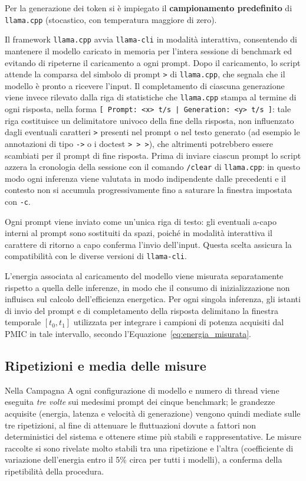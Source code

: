 Per la generazione dei token si è impiegato il \textbf{campionamento predefinito} di
\texttt{llama.cpp} (stocastico, con temperatura maggiore di zero).

Il framework \texttt{llama.cpp} avvia \texttt{llama-cli} in modalità interattiva,
consentendo di mantenere il modello caricato in memoria per l'intera sessione di
benchmark ed evitando di ripeterne il caricamento a ogni prompt. Dopo il caricamento, lo script
attende la comparsa del simbolo di prompt \texttt{>} di \texttt{llama.cpp}, che
segnala che il modello è pronto a ricevere l'input. Il completamento di ciascuna
generazione viene invece rilevato dalla riga di statistiche che \texttt{llama.cpp}
stampa al termine di ogni risposta, nella forma
\texttt{[ Prompt: <x> t/s | Generation: <y> t/s ]}: tale riga costituisce un
delimitatore univoco della fine della risposta, non influenzato dagli eventuali
caratteri \texttt{>} presenti nel prompt o nel testo generato (ad esempio le
annotazioni di tipo \texttt{->} o i doctest \texttt{> > >}), che altrimenti
potrebbero essere scambiati per il prompt di fine risposta. Prima di inviare
ciascun prompt lo script azzera la cronologia della
sessione con il comando \texttt{/clear} di \texttt{llama.cpp}: in questo modo ogni
inferenza viene valutata in modo indipendente dalle precedenti e il contesto non si
accumula progressivamente fino a saturare la finestra impostata con \texttt{-c}.

Ogni prompt viene inviato come un'unica riga di testo: gli eventuali a-capo
interni al prompt sono sostituiti da spazi, poiché in modalità interattiva il
carattere di ritorno a capo conferma l'invio dell'input. Questa scelta assicura la
compatibilità con le diverse versioni di \texttt{llama-cli}.

L'energia associata al caricamento del modello viene misurata separatamente
rispetto a quella delle inferenze, in modo che il consumo di inizializzazione non
influisca sul calcolo dell'efficienza energetica. Per ogni singola
inferenza, gli istanti di invio del prompt e di completamento della risposta
delimitano la finestra temporale $[t_0, t_1]$ utilizzata per integrare i campioni
di potenza acquisiti dal PMIC in tale intervallo, secondo
l'Equazione~\ref{eq:energia_misurata}.

\subsection{Ripetizioni e media delle misure}

Nella Campagna A ogni configurazione di modello e numero di thread viene eseguita
\emph{tre volte} sui medesimi prompt dei cinque benchmark; le grandezze acquisite
(energia, latenza e velocità di generazione) vengono quindi mediate sulle tre
ripetizioni, al fine di attenuare le fluttuazioni dovute a fattori non
deterministici del sistema e ottenere stime più stabili e rappresentative. Le
misure raccolte si sono rivelate molto stabili tra una ripetizione e l'altra
(coefficiente di variazione dell'energia entro il 5\% circa per tutti i modelli),
a conferma della ripetibilità della procedura.

